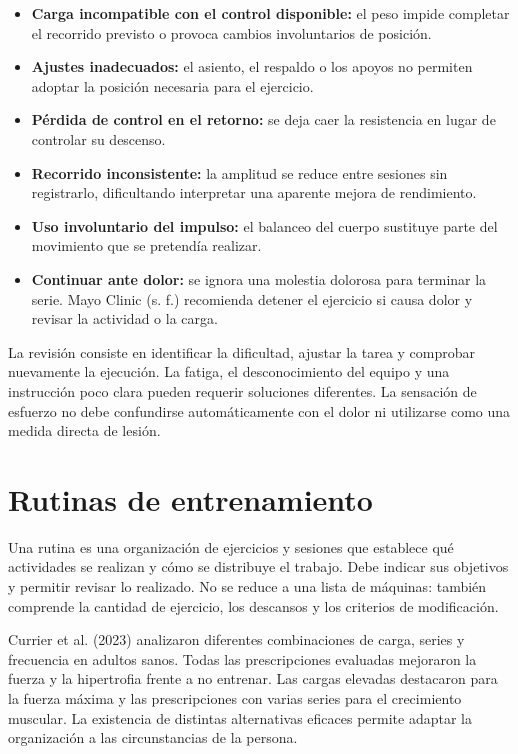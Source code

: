 \begin{itemize}
    \item \textbf{Carga incompatible con el control disponible:} el peso impide completar el recorrido previsto o provoca cambios involuntarios de posición.
    \item \textbf{Ajustes inadecuados:} el asiento, el respaldo o los apoyos no permiten adoptar la posición necesaria para el ejercicio.
    \item \textbf{Pérdida de control en el retorno:} se deja caer la resistencia en lugar de controlar su descenso.
    \item \textbf{Recorrido inconsistente:} la amplitud se reduce entre sesiones sin registrarlo, dificultando interpretar una aparente mejora de rendimiento.
    \item \textbf{Uso involuntario del impulso:} el balanceo del cuerpo sustituye parte del movimiento que se pretendía realizar.
    \item \textbf{Continuar ante dolor:} se ignora una molestia dolorosa para terminar la serie. Mayo Clinic (s. f.) recomienda detener el ejercicio si causa dolor y revisar la actividad o la carga.
\end{itemize}

La revisión consiste en identificar la dificultad, ajustar la tarea y comprobar nuevamente la ejecución. La fatiga, el desconocimiento del equipo y una instrucción poco clara pueden requerir soluciones diferentes. La sensación de esfuerzo no debe confundirse automáticamente con el dolor ni utilizarse como una medida directa de lesión.

\section{Rutinas de entrenamiento}
\label{sec:rutinas-entrenamiento}

Una rutina es una organización de ejercicios y sesiones que establece qué actividades se realizan y cómo se distribuye el trabajo. Debe indicar sus objetivos y permitir revisar lo realizado. No se reduce a una lista de máquinas: también comprende la cantidad de ejercicio, los descansos y los criterios de modificación.

Currier et al. (2023) analizaron diferentes combinaciones de carga, series y frecuencia en adultos sanos. Todas las prescripciones evaluadas mejoraron la fuerza y la hipertrofia frente a no entrenar. Las cargas elevadas destacaron para la fuerza máxima y las prescripciones con varias series para el crecimiento muscular. La existencia de distintas alternativas eficaces permite adaptar la organización a las circunstancias de la persona.

